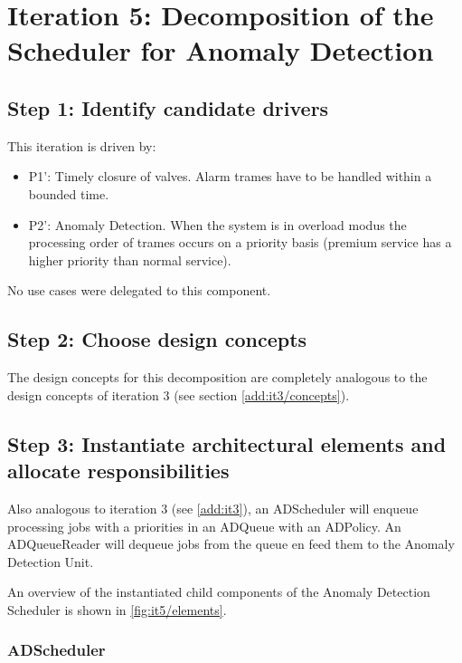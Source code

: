 \section{Iteration 5: Decomposition of the Scheduler for Anomaly Detection}
\label{add:it5}

\subsection{Step 1: Identify candidate drivers}
\label{add:it5/drivers}

\npar This iteration is driven by:

\begin{itemize}
	\item P1': Timely closure of valves. Alarm trames have to be handled within a bounded time. 
	\item P2': Anomaly Detection. When the system is in overload modus the processing order of trames
	  occurs on a priority basis (premium service has a higher priority than
	  normal service).
\end{itemize}

\npar No use cases were delegated to this component.

\subsection{Step 2: Choose design concepts}
\label{add:it5/concepts}

\npar The design concepts for this decomposition are completely analogous to the
design concepts of iteration 3 (see section \ref{add:it3/concepts}). 

\subsection{Step 3: Instantiate architectural elements and allocate responsibilities}
\label{add:it5/elements}

\npar Also analogous to iteration 3 (see \ref{add:it3}), an ADScheduler will
enqueue processing jobs with a priorities in an ADQueue with an ADPolicy. An
ADQueueReader will dequeue jobs from the queue en feed them
to the Anomaly Detection Unit. 

\npar An overview of the instantiated child components of the Anomaly Detection
Scheduler is shown in \ref{fig:it5/elements}.

\subsubsection{ADScheduler}

